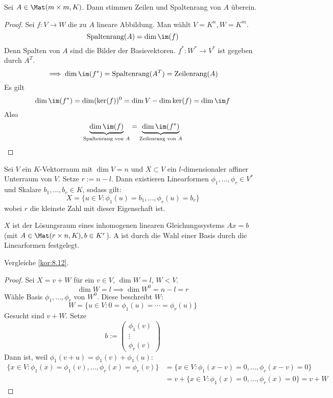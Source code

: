 \documentclass[a4paper, 10pt]{scrbook}
\begin{document}
\begin{kor}
\label{kor:9.14}
Sei $A\in\Mat(m\times m,K)$.
Dann stimmen Zeilen und Spaltenrang von $A$ überein.
\begin{proof}
Sei $f:V\to W$ die zu $A$ lineare Abbildung.
Man wählt $V=K^n, W=K^m$.
\[
\text{Spaltenrang}(A)=\dim\im(f)
\]
Denn Spalten von $A$ sind die Bilder der Basisvektoren.
$f^*:W^*\to V^*$ ist gegeben durch $A^T$.
\[
\implies \dim \im(f^*)=\text{Spaltenrang}(A^T)=\text{Zeilenrang}(A)
\]
Es gilt
\[
\dim\im(f^*)=\dim(\ker(f))^0=\dim V-\dim\ker(f) = \dim \im f
\]
Also
\[
\underbrace{\dim\im(f)}_{\text{Spaltenrang von $A$}}=\underbrace{\dim\im(f^*)}_{\text{Zeilenrang von $A$}}
\]
\end{proof}
\end{kor}

\begin{thm}
\label{thm:9.15}
Sei $V$ ein $K$-Vektorraum mit $\dim V=n$ und $X\subset V$ ein $l$-dimensionaler affiner Unterraum von $V$.
Setze $r:=n-l$.
Dann existieren Linearformen $\phi_1,\dotsc,\phi_r \in V^*$ und Skalare $b_1,\dotsc,b_r \in K$, sodass gilt:
\[
X=\{u\in V:\phi_1(u)=b_1,\dotsc,\phi_r(u)=b_r\}
\]
wobei $r$ die kleinste Zahl mit dieser Eigenschaft ist.

$X$ ist der Lösungsraum eines inhomogenen linearen Gleichungssystems $Ax=b$ (mit $A \in \Mat(r\times n,K), b\in K^r$).
A ist durch die Wahl einer Basis durch die Linearformen festgelegt.

\begin{note}
Vergleiche \ref{kor:8.12}.
\end{note}

\begin{proof}
Sei $X=v+W$ für ein $v\in V$, $\dim W=l$, $W<V$.
\[
\dim W=l \implies \dim W^0=n-l=r
\]
Wähle Basis $\phi_1,\dotsc,\phi_r$ von $W^0$.
Diese beschreibt $W$:
\[
W=\{u\in V:0=\phi_1(u)=\dotsb=\phi_r(u)\}
\]
Gesucht sind $v+W$.
Setze \[b:=\begin{pmatrix}\phi_1(v)\\\vdots\\\phi_r(v)\end{pmatrix}\]
Dann ist, weil $\phi_1(v+u)=\phi_1(v)+\phi_1(u)$:
\begin{align*}
	\{x\in V: \phi_1(x)=\phi_1(v),\dotsc,\phi_r(x)=\phi_r(v)\}
	&= \{x\in V : \phi_1(x-v)=0,\dotsc,\phi_r(x-v)=0\}\\
	&= v + \{x\in V : \phi_1(x)=0,\dotsc,\phi_r(x)=0\} = v + W
\end{align*}
\end{proof}
\end{thm}
\end{document}
